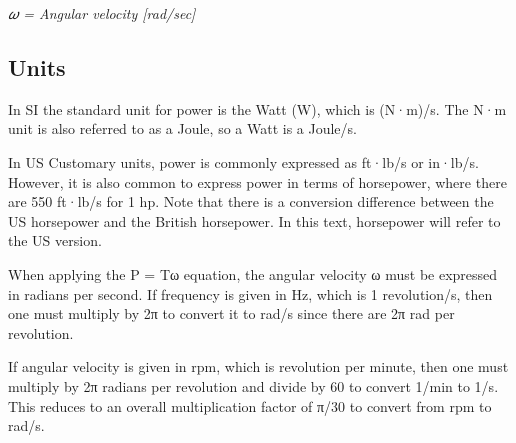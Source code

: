 \documentclass[
  letterpaper,
  DIV=11,
  numbers=noendperiod]{scrreprt}
\theoremstyle{definition}
\theoremstyle{remark}
\begin{document}
\emph{𝜔 = Angular velocity {[}rad/sec{]}}

\subsection{Units}\label{units-1}

In SI the standard unit for power is the Watt (W), which is (N·m)/s. The
N·m unit is also referred to as a Joule, so a Watt is a Joule/s.

In US Customary units, power is commonly expressed as ft·lb/s or
in·lb/s. However, it is also common to express power in terms of
horsepower, where there are 550 ft·lb/s for 1 hp. Note that there is a
conversion difference between the US horsepower and the British
horsepower. In this text, horsepower will refer to the US version.

When applying the P = Tω equation, the angular velocity ω must be
expressed in radians per second. If frequency is given in Hz, which is 1
revolution/s, then one must multiply by 2π to convert it to rad/s since
there are 2π rad per revolution.

If angular velocity is given in rpm, which is revolution per minute,
then one must multiply by 2π radians per revolution and divide by 60 to
convert 1/min to 1/s. This reduces to an overall multiplication factor
of π/30 to convert from rpm to rad/s.
\end{document}
